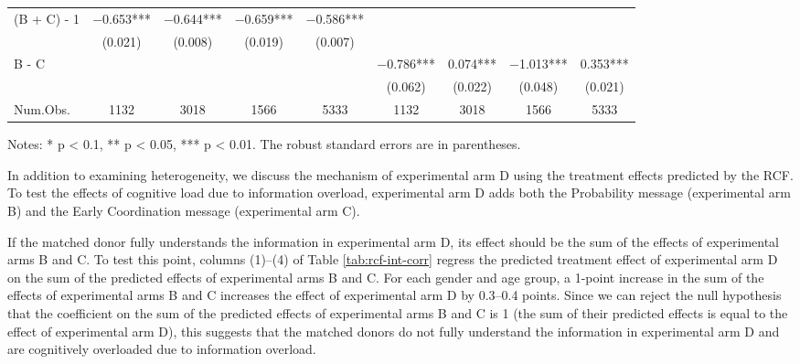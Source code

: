 \documentclass[
]{article}
\begin{document}
\begin{table}
\begin{threeparttable}
\begin{tabular}[t]{lcccccccc}
\hspace{1em}(B + C) - 1 & \num{-0.653}*** & \num{-0.644}*** & \num{-0.659}*** & \num{-0.586}*** &  &  &  & \\
\hspace{1em} & (\num{0.021}) & (\num{0.008}) & (\num{0.019}) & (\num{0.007}) &  &  &  & \\
\hspace{1em}B - C &  &  &  &  & \num{-0.786}*** & \num{0.074}*** & \num{-1.013}*** & \num{0.353}***\\
\hspace{1em} &  &  &  &  & (\num{0.062}) & (\num{0.022}) & (\num{0.048}) & (\num{0.021})\\
\midrule
Num.Obs. & \num{1132} & \num{3018} & \num{1566} & \num{5333} & \num{1132} & \num{3018} & \num{1566} & \num{5333}\\
\bottomrule
\end{tabular}
\begin{tablenotes}
\item Notes: * p < 0.1, ** p < 0.05, *** p < 0.01. The robust standard errors are in parentheses. 
\end{tablenotes}
\end{threeparttable}
\end{table}

In addition to examining heterogeneity, we discuss the mechanism of experimental arm D using the treatment effects predicted by the RCF. To test the effects of cognitive load due to information overload, experimental arm D adds both the Probability message (experimental arm B) and the Early Coordination message (experimental arm C).

If the matched donor fully understands the information in experimental arm D, its effect should be the sum of the effects of experimental arms B and C. To test this point, columns (1)--(4) of Table \ref{tab:rcf-int-corr} regress the predicted treatment effect of experimental arm D on the sum of the predicted effects of experimental arms B and C. For each gender and age group, a 1-point increase in the sum of the effects of experimental arms B and C increases the effect of experimental arm D by 0.3--0.4 points. Since we can reject the null hypothesis that the coefficient on the sum of the predicted effects of experimental arms B and C is 1 (the sum of their predicted effects is equal to the effect of experimental arm D), this suggests that the matched donors do not fully understand the information in experimental arm D and are cognitively overloaded due to information overload.
\end{document}
